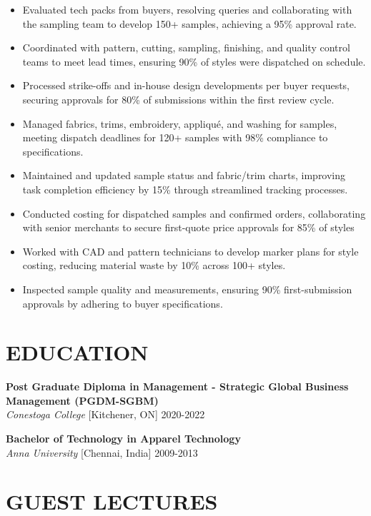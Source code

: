 \documentclass[10pt,letterpaper]{article}
\newcommand{\jobheader}[3]{\textit{#1} \hfill #2 \hfill #3}
\begin{document}
\begin{itemize}
\item Evaluated tech packs from buyers, resolving queries and collaborating with the sampling team to develop 150+ samples, achieving a 95\% approval rate.
\item Coordinated with pattern, cutting, sampling, finishing, and quality control teams to meet lead times, ensuring 90\% of styles were dispatched on schedule.
\item Processed strike-offs and in-house design developments per buyer requests, securing approvals for 80\% of submissions within the first review cycle.
\item Managed fabrics, trims, embroidery, appliqué, and washing for samples, meeting dispatch deadlines for 120+ samples with 98\% compliance to specifications.
\item Maintained and updated sample status and fabric/trim charts, improving task completion efficiency by 15\% through streamlined tracking processes.
\item Conducted costing for dispatched samples and confirmed orders, collaborating with senior merchants to secure first-quote price approvals for 85\% of styles
\item Worked with CAD and pattern technicians to develop marker plans for style costing, reducing material waste by 10\% across 100+ styles.
\item Inspected sample quality and measurements, ensuring 90\% first-submission approvals by adhering to buyer specifications.
\end{itemize}

\section*{EDUCATION}

\textbf{Post Graduate Diploma in Management - Strategic Global Business Management (PGDM-SGBM)}\\
\jobheader{Conestoga College}{[Kitchener, ON]}{2020-2022}

\vspace{6pt}

\textbf{Bachelor of Technology in Apparel Technology}\\
\jobheader{Anna University}{[Chennai, India]}{2009-2013}

\section*{GUEST LECTURES}
\end{document}
